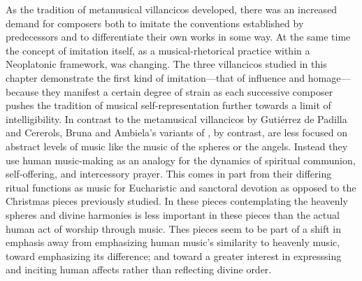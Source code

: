As the tradition of metamusical villancicos developed, there was an increased
demand for composers both to imitate the conventions established by
predecessors and to differentiate their own works in some way. 
At the same time the concept of imitation itself, as a musical-rhetorical
practice within a Neoplatonic framework, was changing.
The three villancicos studied in this chapter demonstrate the first kind of
imitation---that of influence and homage---because they manifest a certain
degree of strain as each successive composer pushes the tradition of musical
self-representation further towards a limit of intelligibility.
In contrast to the metamusical villancicos by Gutiérrez de Padilla and
Cererols, Bruna and Ambiela's variants of , by
contrast, are less focused on abstract levels of music like the music of the
spheres or the angels.
Instead they use human music-making as an analogy for the dynamics of spiritual
communion, self-offering, and intercessory prayer.
This comes in part from their differing ritual functions as music for
Eucharistic and sanctoral devotion as opposed to the Christmas pieces
previously studied.
In these pieces contemplating the heavenly spheres and divine harmonies is less
important in these pieces than the actual human act of worship through music.
Thes pieces seem to be part of a shift in emphasis away from emphasizing human
music's similarity to heavenly music, toward emphasizing its difference; and
toward a greater interest in expresssing and inciting human affects rather than
reflecting divine order.

